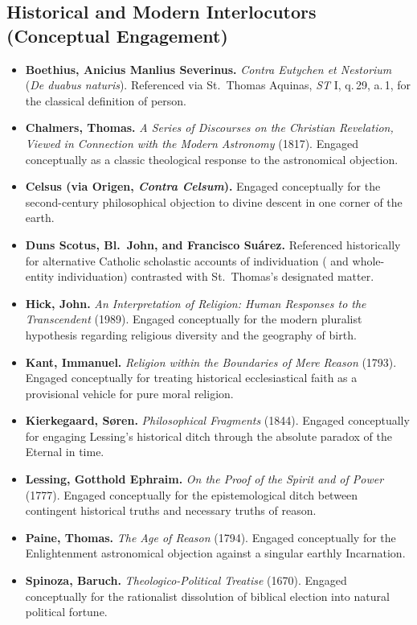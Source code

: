 \subsection*{Historical and Modern Interlocutors (Conceptual Engagement)}

\begin{itemize}
\item \textbf{Boethius, Anicius Manlius Severinus.} \textit{Contra Eutychen et Nestorium} (\textit{De duabus naturis}). Referenced via St.\ Thomas Aquinas, \textit{ST} I, q.\,29, a.\,1, for the classical definition of person.
\item \textbf{Chalmers, Thomas.} \textit{A Series of Discourses on the Christian Revelation, Viewed in Connection with the Modern Astronomy} (1817). Engaged conceptually as a classic theological response to the astronomical objection.
\item \textbf{Celsus (via Origen, \textit{Contra Celsum}).} Engaged conceptually for the second-century philosophical objection to divine descent in one corner of the earth.
\item \textbf{Duns Scotus, Bl.\ John, and Francisco Su\'arez.} Referenced historically for alternative Catholic scholastic accounts of individuation ( and whole-entity individuation) contrasted with St.\ Thomas's designated matter.
\item \textbf{Hick, John.} \textit{An Interpretation of Religion: Human Responses to the Transcendent} (1989). Engaged conceptually for the modern pluralist hypothesis regarding religious diversity and the geography of birth.
\item \textbf{Kant, Immanuel.} \textit{Religion within the Boundaries of Mere Reason} (1793). Engaged conceptually for treating historical ecclesiastical faith as a provisional vehicle for pure moral religion.
\item \textbf{Kierkegaard, S\o ren.} \textit{Philosophical Fragments} (1844). Engaged conceptually for engaging Lessing's historical ditch through the absolute paradox of the Eternal in time.
\item \textbf{Lessing, Gotthold Ephraim.} \textit{On the Proof of the Spirit and of Power} (1777). Engaged conceptually for the epistemological ditch between contingent historical truths and necessary truths of reason.
\item \textbf{Paine, Thomas.} \textit{The Age of Reason} (1794). Engaged conceptually for the Enlightenment astronomical objection against a singular earthly Incarnation.
\item \textbf{Spinoza, Baruch.} \textit{Theologico-Political Treatise} (1670). Engaged conceptually for the rationalist dissolution of biblical election into natural political fortune.
\end{itemize}
